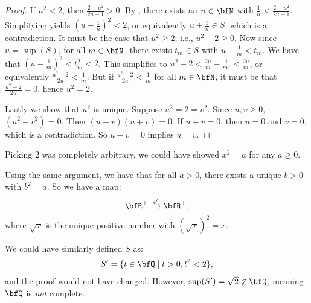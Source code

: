 \begin{proof}
            If $u^2 < 2$, then $\frac{2-u^2}{2u+1} > 0$. By , there exists an $n\in \bfN$ with $\frac{1}{n} < \frac{2-u^2}{2u+1}$. Simplifying yields $(u+\frac{1}{n})^2 < 2$, or equivalently $u + \frac{1}{n} \in S$, which is a contradiction. It must be the case that $u^2 \geq 2$; i.e., $u^2 - 2 \geq 0$. Now since $u = \sup(S)$, for all $m \in \bfN$, there exists $t_m \in S$ with $u - \frac{1}{m} < t_m$. We have that $(u - \frac{1}{m})^2 < t_m^2 < 2$. This simplifies to $u^2 - 2 < \frac{2u}{m} - \frac{1}{m^2} < \frac{2u}{m}$, or equivalently $\frac{u^2 - 2}{2u} < \frac{1}{m}$. But if $\frac{u^2 - 2}{2u} < \frac{1}{m}$ for all $m \in \bfN$, it must be that $\frac{u^2 - 2}{2u} = 0$, hence $u^2 = 2$.

            Lastly we show that $u^2$ is unique. Suppose $u^2 = 2 = v^2$. Since $u,v \geq 0$, $(u^2 - v^2) = 0$. Then $(u-v)(u+v) = 0$. If $u+v = 0$, then $u = 0$ and $v = 0$, which is a contradiction. So $u-v = 0$ implies $u = v$.
        \end{proof}

        \begin{remark}
            Picking $2$ was completely arbitrary, we could have showed $x^2 = a$ for any $a \geq 0$.
        \end{remark}

        \begin{remark}
            Using the same argument, we have that for all $a > 0$, there exists a unique $b > 0$ with $b^2 = a$. So we have a map:
                \begin{equation*}
                    \bfR^+ \xrightarrow{\sqrt{}} \bfR^+,
                \end{equation*}
            where $\sqrt{x}$ is the unique positive number with $(\sqrt{x})^2 = x$.
        \end{remark}

        \begin{remark}
            We could have similarly defined $S$ as:
                \begin{equation*}
                \begin{split}
                    S' = \{t \in \bfQ \mid t>0, t^2 < 2\},
                \end{split}
                \end{equation*}
            and the proof would not have changed. However, $\sup(S') = \sqrt{2} \not\in \bfQ$, meaning $\bfQ$ is \textit{not} complete.
        \end{remark}

